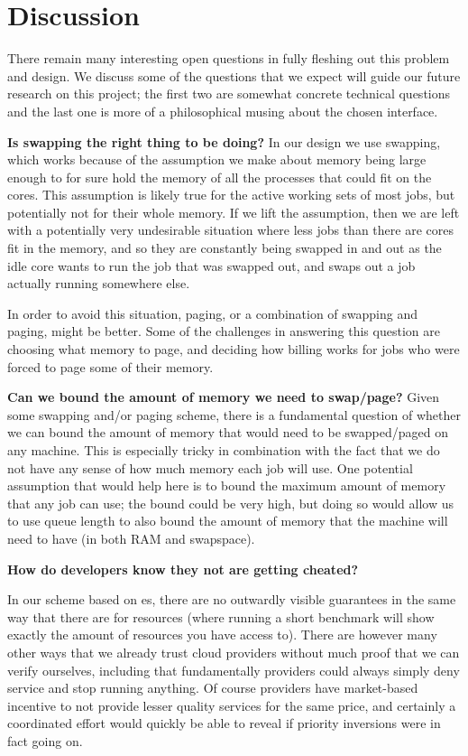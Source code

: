 \section{Discussion}


There remain many interesting open questions in fully fleshing out this problem
and design. We discuss some of the questions that we expect will guide our
future research on this project; the first two are somewhat concrete technical
questions and the last one is more of a philosophical musing about the chosen
interface.


\textbf{Is swapping the right thing to be doing?}
In our design we use swapping, which works because of the assumption we make
about memory being large enough to for sure hold the memory of all the processes
that could fit on the cores. This assumption is likely true for the active
working sets of most jobs, but potentially not for their whole memory. If we
lift the assumption, then we are left with a potentially very undesirable
situation where less jobs than there are cores fit in the memory, and so they
are constantly being swapped in and out as the idle core wants to run the job
that was swapped out, and swaps out a job actually running somewhere else.

In order to avoid this situation, paging, or a combination of swapping and
paging, might be better. Some of the challenges in answering this question are
choosing what memory to page, and deciding how billing works for jobs who were
forced to page some of their memory. 

\textbf{Can we bound the amount of memory we need to swap/page?}
Given some swapping and/or paging scheme, there is a fundamental question of
whether we can bound the amount of memory that would need to be swapped/paged on
any machine. This is especially tricky in combination with the fact that we do
not have any sense of how much memory each job will use. One potential
assumption that would help here is to bound the maximum amount of memory that
any job can use; the bound could be very high, but doing so would allow us to
use queue length to also bound the amount of memory that the machine will need
to have (in both RAM and swapspace).


\textbf{How do developers know they not are getting cheated?}

In our scheme based on \priceclass{}es, there are no outwardly visible
guarantees in the same way that there are for resources (where running a short
benchmark will show exactly the amount of resources you have access to). There
are however many other ways that we already trust cloud providers without much
proof that we can verify ourselves, including that fundamentally providers could
always simply deny service and stop running anything. Of course providers have
market-based incentive to not provide lesser quality services for the same
price, and certainly a coordinated effort would quickly be able to reveal if
priority inversions were in fact going on.



